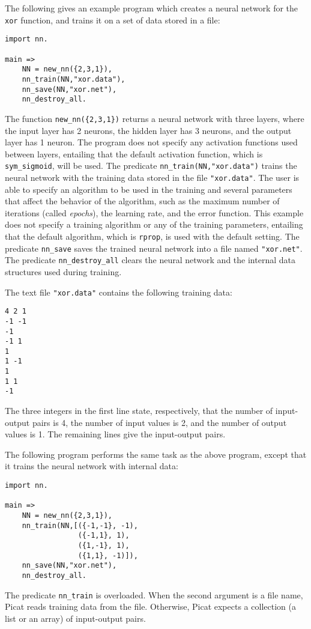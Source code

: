 The following gives an example program which creates a neural network for the \texttt{xor} function,  and trains it on a set of data stored in a file:
\begin{verbatim}
import nn.

main =>
    NN = new_nn({2,3,1}),
    nn_train(NN,"xor.data"),
    nn_save(NN,"xor.net"),
    nn_destroy_all.
\end{verbatim}
The function \texttt{new\_nn(\{2,3,1\})} returns a neural network with three layers, where the input layer has 2 neurons, the hidden layer has 3 neurons, and the output layer has 1 neuron. The program does not specify any activation functions used between layers, entailing that the default activation function, which is \texttt{sym\_sigmoid}, will be used. The predicate \texttt{nn\_train(NN,"xor.data")} trains the neural network with the training data stored in the file \texttt{"xor.data"}. The user is able to specify an algorithm to be used in the training and several parameters that affect the behavior of the algorithm, such as the maximum number of iterations (called \textit{epochs}), the learning rate, and the error function. This example does not specify a training algorithm or any of the training parameters, entailing that the default algorithm, which is \texttt{rprop}, is used with the default setting. The predicate \texttt{nn\_save} saves the trained neural network into a file named \texttt{"xor.net"}. The predicate \texttt{nn\_destroy\_all} clears the neural network and the internal data structures used during training.

The text file \texttt{"xor.data"} contains the following training data:
\begin{verbatim}
4 2 1
-1 -1
-1
-1 1
1
1 -1
1
1 1
-1
\end{verbatim}
The three integers in the first line state, respectively, that the number of input-output pairs is 4, the number of input values is 2, and the number of output values is 1. The remaining lines give the input-output pairs. 

The following program performs the same task as the above program, except that it trains the neural network with internal data:
\begin{verbatim}
import nn.

main =>
    NN = new_nn({2,3,1}),
    nn_train(NN,[({-1,-1}, -1), 
                 ({-1,1}, 1), 
                 ({1,-1}, 1), 
                 ({1,1}, -1)]),
    nn_save(NN,"xor.net"),
    nn_destroy_all.
\end{verbatim}
The predicate \texttt{nn\_train} is overloaded. When the second argument is a file name, Picat reads training data from the file. Otherwise, Picat expects a collection (a list or an array) of input-output pairs.

